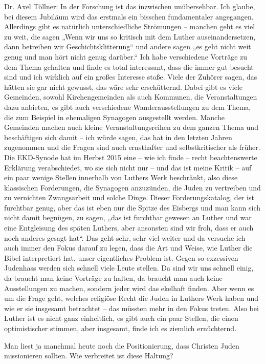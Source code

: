 Dr. Axel Töllner: In der Forschung ist das inzwischen unübersehbar. Ich glaube, bei diesem Jubiläum wird das erstmals ein bisschen fundamentaler angegangen. Allerdings gibt es natürlich unterschiedliche Strömungen – manchen geht es viel zu weit, die sagen „Wenn wir uns so kritisch mit dem Luther auseinandersetzen, dann betreiben wir Geschichtsklitterung“ und andere sagen „es geht nicht weit genug und man hört nicht genug darüber.“ Ich habe verschiedene Vorträge zu dem Thema gehalten und finde es total interessant, dass die immer gut besucht sind und ich wirklich auf ein großes Interesse stoße. Viele der Zuhörer sagen, das hätten sie gar nicht gewusst, das wäre sehr erschütternd. Dabei gibt es viele Gemeinden, sowohl Kirchengemeinden als auch Kommunen, die Veranstaltungen dazu anbieten, es gibt auch verschiedene Wanderausstellungen zu dem Thema, die zum Beispiel in ehemaligen Synagogen ausgestellt werden. Manche Gemeinden machen auch kleine Veranstaltungsreihen zu dem ganzen Thema und beschäftigen sich damit – ich würde sagen, das hat in den letzten Jahren zugenommen und die Fragen sind auch ernsthafter und selbstkritischer als früher.  
Die EKD-Synode hat im Herbst 2015 eine – wie ich finde – recht beachtenswerte Erklärung verabschiedet, wo sie sich nicht nur – und das ist meine Kritik – auf ein paar wenige Stellen innerhalb von Luthers Werk beschränkt, also diese klassischen Forderungen, die Synagogen anzuzünden, die Juden zu vertreiben und zu vernichten Zwangsarbeit und solche Dinge. Dieser Forderungskatalog, der ist furchtbar genug, aber das ist eben nur die Spitze des Eisbergs und man kann sich nicht damit begnügen, zu sagen, „das ist furchtbar gewesen an Luther und war eine Entgleisung des späten Luthers, aber ansonsten sind wir froh, dass er auch noch anderes gesagt hat“. Das geht sehr, sehr viel weiter und da versuche ich auch immer den Fokus darauf zu legen, dass die Art und Weise, wie Luther die Bibel interpretiert hat, unser eigentliches Problem ist. 
Gegen so exzessiven Judenhass werden sich schnell viele Leute stellen. Da sind wir uns schnell einig, da braucht man keine Vorträge zu halten, da braucht man auch keine Ausstellungen zu machen, sondern jeder wird das ekelhaft finden. Aber wenn es um die Frage geht, welches religiöse Recht die Juden in Luthers Werk haben und wie er sie insgesamt betrachtet – das müssten mehr in den Fokus treten. Also bei Luther ist es nicht ganz einheitlich, es gibt auch ein paar Stellen, die einen optimistischer stimmen, aber insgesamt, finde ich es ziemlich ernüchternd. 

 
Man liest ja manchmal heute noch die Positionierung, dass Christen Juden missionieren sollten. Wie verbreitet ist diese Haltung? 

